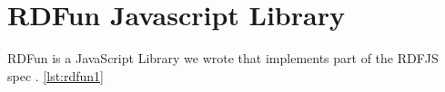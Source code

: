 \chapter{RDFun Javascript Library}

RDFun is a JavaScript Library we wrote that implements part of the RDFJS spec \cite{rdfjs}. \ref{lst:rdfun1}



\newpage


